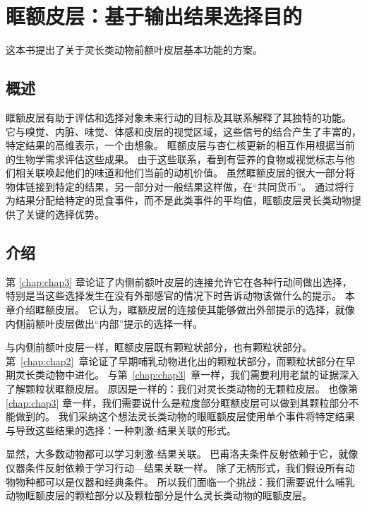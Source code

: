 \chapter{眶额皮层：基于输出结果选择目的}\label{chap:chap4}

这本书提出了关于灵长类动物前额叶皮层基本功能的方案。



\section{概述}

眶额皮层有助于评估和选择对象未来行动的目标及其联系解释了其独特的功能。 
它与嗅觉、内脏、味觉、体感和皮层的视觉区域，这些信号的结合产生了丰富的，特定结果的高维表示，一个由想象。
眶额皮层与杏仁核更新的相互作用根据当前的生物学需求评估这些成果。
由于这些联系，看到有营养的食物或视觉标志与他们相关联唤起他们的味道和他们当前的动机价值。 
虽然眶额皮层的很大一部分将物体链接到特定的结果，另一部分对一般结果这样做，在“共同货币”。
通过将行为结果分配给特定的觅食事件，而不是此类事件的平均值，眶额皮层灵长类动物提供了关键的选择优势。



\section{介绍}

第 \ref{chap:chap3} 章论证了内侧前额叶皮层的连接允许它在各种行动间做出选择，特别是当这些选择发生在没有外部感官的情况下时告诉动物该做什么的提示。
本章介绍眶额皮层。
它认为，眶额皮层的连接使其能够做出外部提示的选择，就像内侧前额叶皮层做出“内部”提示的选择一样。


与内侧前额叶皮层一样，眶额皮层既有颗粒状部分，也有颗粒状部分。
第~\ref{chap:chap2}~章论证了早期哺乳动物进化出的颗粒状部分，而颗粒状部分在早期灵长类动物中进化。
与第~\ref{chap:chap3}~章一样，我们需要利用老鼠的证据深入了解颗粒状眶额皮层。
原因是一样的：我们对灵长类动物的无颗粒皮层。
也像第 \ref{chap:chap3} 章一样，我们需要说什么是粒度部分眶额皮层可以做到其颗粒部分不能做到的。
我们采纳这个想法灵长类动物的眼眶额皮层使用单个事件将特定结果与导致这些结果的选择：一种刺激-结果关联的形式。\par


显然，大多数动物都可以学习刺激-结果关联。
巴甫洛夫条件反射依赖于它，就像仪器条件反射依赖于学习行动—结果关联一样。
除了无柄形式，我们假设所有动物物种都可以是仪器和经典条件。
所以我们面临一个挑战：我们需要说什么哺乳动物眶额皮层的颗粒部分以及颗粒部分是什么灵长类动物的眶额皮层。\par


